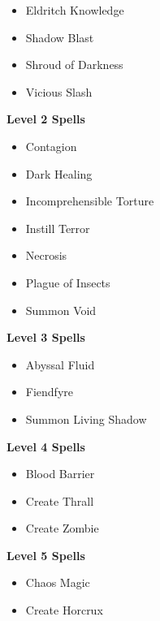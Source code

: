 \begin{multicols}{4}
\begin{itemize}[itemsep=0em]
\item Eldritch Knowledge

\item Shadow Blast

\item Shroud of Darkness

\item Vicious Slash


\end{itemize}
\textbf{Level 2 Spells}
\begin{itemize}[itemsep=0em]
\renewcommand\labelitemi{-}
\item Contagion

\item Dark Healing

\item Incomprehensible Torture

\item Instill Terror

\item Necrosis

\item Plague of Insects

\item Summon Void


\end{itemize}
\textbf{Level 3 Spells}
\begin{itemize}[itemsep=0em]
\renewcommand\labelitemi{-}
\item Abyssal Fluid

\item Fiendfyre

\item Summon Living Shadow


\end{itemize}
\textbf{Level 4 Spells}
\begin{itemize}[itemsep=0em]
\renewcommand\labelitemi{-}
\item Blood Barrier

\item Create Thrall

\item Create Zombie


\end{itemize}
\textbf{Level 5 Spells}
\begin{itemize}[itemsep=0em]
\renewcommand\labelitemi{-}
\item Chaos Magic

\item Create Horcrux


\end{itemize}
\end{multicols}
